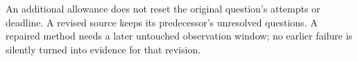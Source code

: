 An additional allowance does not reset the original question's attempts or
deadline. A revised source keeps its predecessor's unresolved questions. A
repaired method needs a later untouched observation window; no earlier failure
is silently turned into evidence for that revision.

\endgroup
\clearpage
